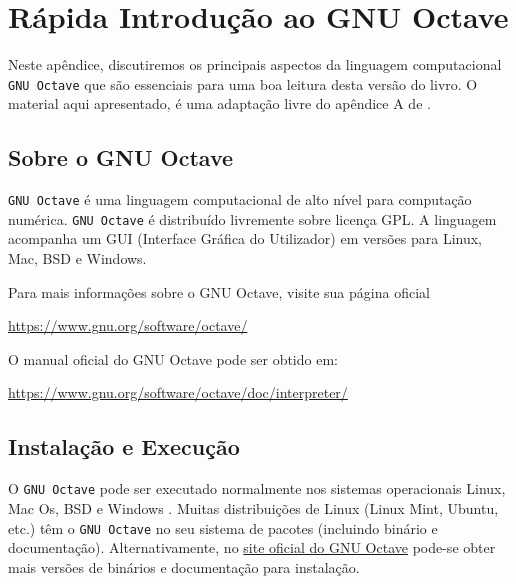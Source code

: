 
\chapter{Rápida Introdução ao GNU Octave}\label{cap:octave}

Neste apêndice, discutiremos os principais aspectos da linguagem computacional \verb+GNU Octave+ que são essenciais para uma boa leitura desta versão do livro. O material aqui apresentado, é uma adaptação livre do apêndice A de \cite{CALSCI}.

\section{Sobre o GNU Octave}

\verb+GNU Octave+ é uma linguagem computacional de alto nível para computação numérica. \verb+GNU Octave+ é distribuído livremente sobre licença GPL. A linguagem acompanha um GUI (Interface Gráfica do Utilizador) em versões para Linux, Mac, BSD e Windows. 

Para mais informações sobre o GNU Octave, visite sua página oficial
\begin{center}
  \url{https://www.gnu.org/software/octave/}
\end{center}

O manual oficial do GNU Octave pode ser obtido em:
\begin{center}
  \url{https://www.gnu.org/software/octave/doc/interpreter/}
\end{center}

\section{Instalação e Execução}

O \verb+GNU Octave+ pode ser executado normalmente nos sistemas operacionais Linux, Mac Os, BSD e Windows . Muitas distribuições de Linux (Linux Mint, Ubuntu, etc.) têm o \verb+GNU Octave+ no seu sistema de pacotes (incluindo binário e documentação). Alternativamente, no \href{https://www.gnu.org/software/octave/}{site oficial do GNU Octave} pode-se obter mais versões de binários e documentação para instalação.

